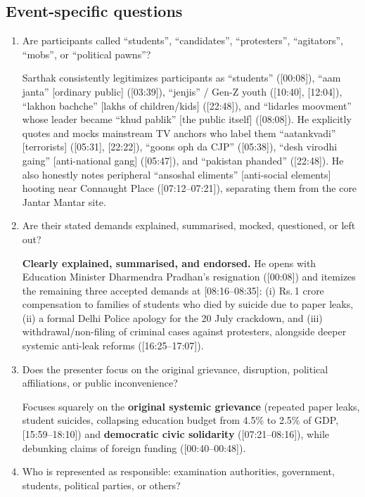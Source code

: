 \documentclass[10pt,a4paper]{article}
\begin{document}
\subsection*{Event-specific questions}
{\small
\begin{enumerate}[leftmargin=1.5em, itemsep=6pt, topsep=4pt]
  \item Are participants called ``students'', ``candidates'', ``protesters'', ``agitators'', ``mobs'', or ``political pawns''?\par\smallskip
  Sarthak consistently legitimizes participants as ``students'' ([00:08]), ``aam janta'' [ordinary public] ([03:39]), ``jenjis'' / Gen-Z youth ([10:40], [12:04]), ``lakhon bachche'' [lakhs of children/kids] ([22:48]), and ``lidarles moovment'' whose leader became ``khud pablik'' [the public itself] ([08:08]). He explicitly quotes and mocks mainstream TV anchors who label them ``aatankvadi'' [terrorists] ([05:31], [22:22]), ``goons oph da CJP'' ([05:38]), ``desh virodhi gaing'' [anti-national gang] ([05:47]), and ``pakistan phanded'' ([22:48]). He also honestly notes peripheral ``ansoshal eliments'' [anti-social elements] hooting near Connaught Place ([07:12--07:21]), separating them from the core Jantar Mantar site.
  \item Are their stated demands explained, summarised, mocked, questioned, or left out?\par\smallskip
  \textbf{Clearly explained, summarised, and endorsed.} He opens with Education Minister Dharmendra Pradhan's resignation ([00:08]) and itemizes the remaining three accepted demands at [08:16--08:35]: (i) Rs.\,1 crore compensation to families of students who died by suicide due to paper leaks, (ii) a formal Delhi Police apology for the 20 July crackdown, and (iii) withdrawal/non-filing of criminal cases against protesters, alongside deeper systemic anti-leak reforms ([16:25--17:07]).
  \item Does the presenter focus on the original grievance, disruption, political affiliations, or public inconvenience?\par\smallskip
  Focuses squarely on the \textbf{original systemic grievance} (repeated paper leaks, student suicides, collapsing education budget from 4.5\% to 2.5\% of GDP, [15:59--18:10]) and \textbf{democratic civic solidarity} ([07:21--08:16]), while debunking claims of foreign funding ([00:40--00:48]).
  \item Who is represented as responsible: examination authorities, government, students, political parties, or others?\par\smallskip

\end{enumerate}}
\end{document}
